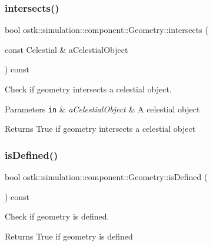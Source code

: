\subsubsection{\texorpdfstring{intersects()}{intersects()}\hspace{0.1cm}{\footnotesize\ttfamily [2/2]}}
{\footnotesize\ttfamily bool ostk\+::simulation\+::component\+::\+Geometry\+::intersects (\begin{DoxyParamCaption}\item[{const Celestial \&}]{a\+Celestial\+Object }\end{DoxyParamCaption}) const}



Check if geometry intersects a celestial object. 


\begin{DoxyParams}[1]{Parameters}
\mbox{\tt in}  & {\em a\+Celestial\+Object} & A celestial object \\
\hline
\end{DoxyParams}
\begin{DoxyReturn}{Returns}
True if geometry intersects a celestial object 
\end{DoxyReturn}
\mbox{\label{classostk_1_1simulation_1_1component_1_1_geometry_a74a72f8e07513ba52a41a006c2e7687c}} 
\subsubsection{\texorpdfstring{is\+Defined()}{isDefined()}}
{\footnotesize\ttfamily bool ostk\+::simulation\+::component\+::\+Geometry\+::is\+Defined (\begin{DoxyParamCaption}{ }\end{DoxyParamCaption}) const}



Check if geometry is defined. 

\begin{DoxyReturn}{Returns}
True if geometry is defined 
\end{DoxyReturn}
\mbox{\label{classostk_1_1simulation_1_1component_1_1_geometry_adf01650ac1c43b91e91ae364f79000b2}} 

